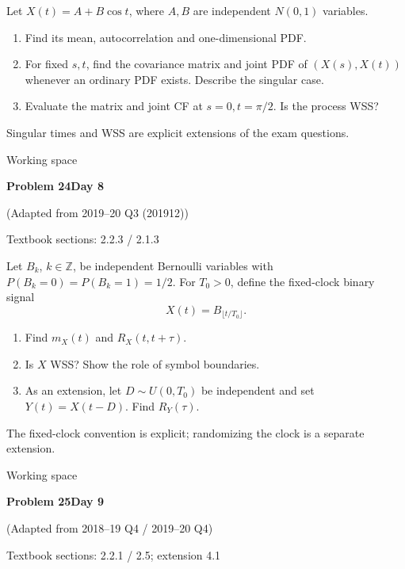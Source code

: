 \documentclass[11pt]{article}
\newcommand{\qtitle}[2]{\clearpage\begin{tcolorbox}[colback=navy,colframe=navy,arc=1.5pt,boxrule=0pt]\color{white}\large\bfseries #1\hfill\small #2\end{tcolorbox}}
\begin{document}
\begin{tcolorbox}[colback=qbg,colframe=qbg,boxrule=0pt]Let $X(t)=A+B\cos t$, where $A,B$ are independent $N(0,1)$ variables.
\begin{enumerate}\item Find its mean, autocorrelation and one-dimensional PDF.\item For fixed $s,t$, find the covariance matrix and joint PDF of $(X(s),X(t))$ whenever an ordinary PDF exists. Describe the singular case.\item Evaluate the matrix and joint CF at $s=0,t=\pi/2$. Is the process WSS?\end{enumerate}
Singular times and WSS are explicit extensions of the exam questions.
\end{tcolorbox}\smallskip\begin{workspace}\hfill{\color{linec}\footnotesize Working space}\end{workspace}
\qtitle{Problem 24}{Day 8}
{\small\color{accentred}(Adapted from 2019--20 Q3 (201912))}\par\smallskip
{\small\color{muted}Textbook sections: 2.2.3 / 2.1.3}\par\medskip
\begin{tcolorbox}[colback=qbg,colframe=qbg,boxrule=0pt]Let $B_k$, $k\in\mathbb Z$, be independent Bernoulli variables with $P(B_k=0)=P(B_k=1)=1/2$. For $T_0>0$, define the fixed-clock binary signal
\[X(t)=B_{\lfloor t/T_0\rfloor}.\]
\begin{enumerate}\item Find $m_X(t)$ and $R_X(t,t+\tau)$.\item Is $X$ WSS? Show the role of symbol boundaries.\item As an extension, let $D\sim U(0,T_0)$ be independent and set $Y(t)=X(t-D)$. Find $R_Y(\tau)$.\end{enumerate}
The fixed-clock convention is explicit; randomizing the clock is a separate extension.
\end{tcolorbox}\smallskip\begin{workspace}\hfill{\color{linec}\footnotesize Working space}\end{workspace}
\qtitle{Problem 25}{Day 9}
{\small\color{accentred}(Adapted from 2018--19 Q4 / 2019--20 Q4)}\par\smallskip
{\small\color{muted}Textbook sections: 2.2.1 / 2.5; extension 4.1}\par\medskip
\end{document}
